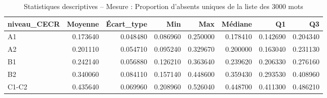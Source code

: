 \begin{table}
\caption{Statistiques descriptives – Mesure : Proportion d'absents uniques de la liste des 3000 mots}
\label{tab:stats_PA_SUBTLEX_3000_U}
\begin{tabular}{lrrrrrrr}
\toprule
niveau_CECR & Moyenne & Écart_type & Min & Max & Médiane & Q1 & Q3 \\
\midrule
A1 & 0.173640 & 0.048480 & 0.086960 & 0.250000 & 0.178410 & 0.142690 & 0.204340 \\
A2 & 0.201110 & 0.054710 & 0.095240 & 0.329670 & 0.200000 & 0.163040 & 0.231130 \\
B1 & 0.242140 & 0.056880 & 0.126210 & 0.363640 & 0.239620 & 0.206330 & 0.276160 \\
B2 & 0.340060 & 0.084110 & 0.157140 & 0.448600 & 0.359430 & 0.293530 & 0.408960 \\
C1-C2 & 0.435640 & 0.069960 & 0.208960 & 0.526040 & 0.448700 & 0.411300 & 0.486210 \\
\bottomrule
\end{tabular}
\end{table}
